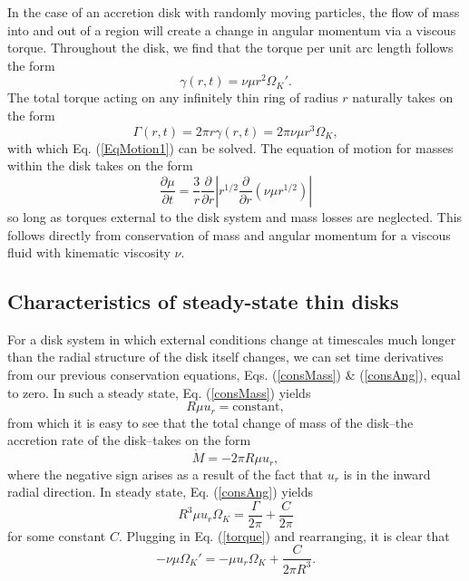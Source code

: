 \documentclass[aps,pra, twocolumn]{revtex4-1}
\begin{document}
In the case of an accretion disk with randomly moving particles, the flow of mass into and out of a region will create a change in angular momentum via a viscous torque.  Throughout the disk, we find that the torque per unit arc length follows the form \cite{king2002}
\begin{equation}
\gamma(r, t) = \nu \mu r^2 \Omega_K'. \nonumber
\end{equation}
The total torque acting on any infinitely thin ring of radius $r$ naturally takes on the form
\begin{equation}
\Gamma(r, t) = 2 \pi r \gamma(r, t) = 2 \pi \nu \mu r^3 \Omega_K, \label{torque}
\end{equation}
with which Eq. (\ref{EqMotion1}) can be solved.  The equation of motion for masses within the disk takes on the form
\begin{equation}
\frac{\partial \mu}{\partial t} = \frac{3}{r} \frac{\partial}{\partial r} \left| r^{1/2}\frac{\partial}{\partial r}\left( \nu \mu r^{1/2} \right) \right|
\end{equation}
so long as torques external to the disk system and mass losses are neglected\cite{king2002, armitage2011}.  This follows directly from conservation of mass and angular momentum for a viscous fluid with kinematic viscosity $\nu$.


\subsection{\label{section 2.2} Characteristics of steady-state thin disks}
For a disk system in which external conditions change at timescales much longer than the radial structure of the disk itself changes, we can set time derivatives from our previous conservation equations, Eqs. (\ref{consMass}) \& (\ref{consAng}), equal to zero.  In such a steady state, Eq. (\ref{consMass}) yields
\begin{equation}
R\mu u_r = \text{constant}, \nonumber
\end{equation}
from which it is easy to see that the total change of mass of the disk--the accretion rate of the disk--takes on the form
\begin{equation}
\dot{M} = -2\pi R \mu u_r, \label{modifiedMass1}
\end{equation}
where the negative sign arises as a result of the fact that $u_r$ is in the inward radial direction.  In steady state, Eq. (\ref{consAng}) yields
\begin{equation}
R^3 \mu u_r \Omega_K = \frac{\Gamma}{2\pi} + \frac{C}{2\pi} \nonumber
\end{equation}
for some constant $C$.  Plugging in Eq. (\ref{torque}) and rearranging, it is clear that \cite{king2002}
\begin{equation}
- \nu \mu \Omega_K' = -\mu u_r \Omega_K  + \frac{C}{2\pi R^3 }. \label{modifiedAng1}
\end{equation}
\end{document}

